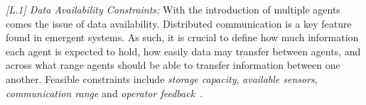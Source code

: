\documentclass[runningheads]{llncs}
\begin{document}
\emph{[L.1] Data Availability Constraints:}
With the introduction of multiple agents comes the issue of data availability. Distributed communication is a key feature found in emergent systems. As such, it is crucial to define how much information each agent is expected to hold, how easily data may transfer between agents, and across what range agents should be able to transfer information between one another. 
Feasible constraints include \emph{storage capacity}, \emph{available sensors}, \emph{communication range} and \emph{operator feedback}~\cite{Jones2022}.  
\end{document}
